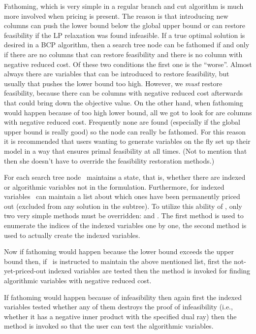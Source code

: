Fathoming, which is very simple
in a regular branch and cut algorithm is much more involved when
pricing is present. The reason is that introducing new columns can
push the lower bound below the global upper bound or can restore
feasibility if the LP relaxation was found infeasible. If a true
optimal solution is desired in a BCP algorithm, then a search tree
node can be fathomed if and only if there are no columns that can
restore feasibility and there is no column with negative reduced cost.
Of these two conditions the first one is the ``worse''. Almost always
there are variables that can be introduced to restore feasibility, but
usually that pushes the lower bound too high. However, we {\em must}
restore feasibility, because there can be columns with negative
reduced cost afterwards that could bring down the objective value. On
the other hand, when fathoming would happen because of too high lower
bound, all we got to look for are columns with negative reduced cost.
Frequently none are found (especially if the global upper bound is
really good) so the node can really be fathomed. For this reason it is
recommended that users wanting to generate variables on the fly set up
their model in a way that ensures primal feasibility at all times.
(Not to mention that then she doesn't have to override the feasibility
restoration methods.)

For each search tree node \BB\ maintains a state, that is, whether there are
indexed or algorithmic variables not in the formulation. Furthermore, for
indexed variables \BB\ can maintain a list about which ones have been
permanently priced out (excluded from any solution in the subtree). To utilize
this ability of \BB, only two very simple methods must be overridden:
 and . The first
method is 
used to enumerate the indices of the indexed variables one by one, the second
method is used to actually create the indexed variables.

Now if fathoming would happen because the lower bound exceeds the upper bound
then, if \BB\ is instructed to maintain the above mentioned list, first the
not-yet-priced-out indexed variables are tested then the 
 method is invoked for finding algorithmic
variables with negative reduced cost. 

If fathoming would happen because of infeasibility then again first the
indexed variables tested whether any of them destroys the proof of
infeasibility (i.e., whether it has a negative inner product with the
specified dual ray) then the  method is invoked so
that the user can test the algorithmic variables.

